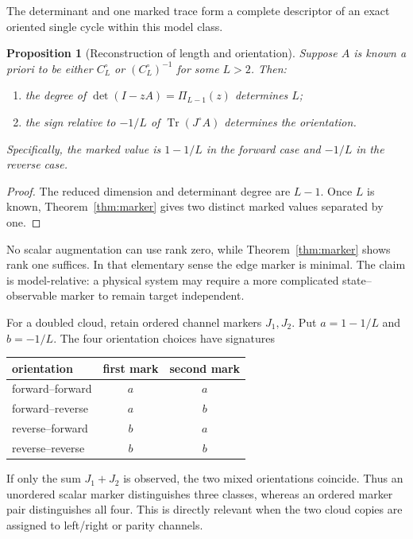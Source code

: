 \documentclass[12pt]{article}
\newtheorem{proposition}[theorem]{Proposition}
\theoremstyle{remark}
\newcommand{\Tr}{\operatorname{Tr}}
\begin{document}
The determinant and one marked trace form a complete descriptor of an exact
oriented single cycle within this model class.

\begin{proposition}[Reconstruction of length and orientation]
\label{prop:reconstruct}
Suppose $A$ is known a priori to be either $C_L^\circ$ or
$(C_L^\circ)^{-1}$ for some $L>2$.  Then:
\begin{enumerate}[leftmargin=2em]
\item the degree of $\det(I-zA)=\Pi_{L-1}(z)$ determines $L$;
\item the sign relative to $-1/L$ of $\Tr(J^\circ A)$ determines the
orientation.
\end{enumerate}
Specifically, the marked value is $1-1/L$ in the forward case and $-1/L$ in
the reverse case.
\end{proposition}

\begin{proof}
The reduced dimension and determinant degree are $L-1$.  Once $L$ is known,
Theorem~\ref{thm:marker} gives two distinct marked values separated by one.
\end{proof}

No scalar augmentation can use rank zero, while Theorem~\ref{thm:marker}
shows rank one suffices.  In that elementary sense the edge marker is
minimal.  The claim is model-relative: a physical system may require a more
complicated state--observable marker to remain target independent.

For a doubled cloud, retain ordered channel markers $J_1,J_2$.  Put
$a=1-1/L$ and $b=-1/L$.  The four orientation choices have signatures
\begin{center}
\begin{tabular}{lcc}
\toprule
orientation & first mark & second mark\\
\midrule
forward--forward & $a$ & $a$\\
forward--reverse & $a$ & $b$\\
reverse--forward & $b$ & $a$\\
reverse--reverse & $b$ & $b$\\
\bottomrule
\end{tabular}
\end{center}
If only the sum $J_1+J_2$ is observed, the two mixed orientations coincide.
Thus an unordered scalar marker distinguishes three classes, whereas an
ordered marker pair distinguishes all four.  This is directly relevant when
the two cloud copies are assigned to left/right or parity channels.
\end{document}
